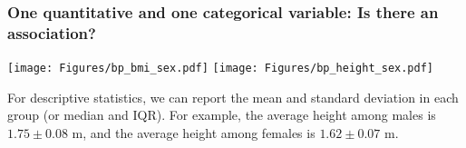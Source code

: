 \begin{frame}
\frametitle{One quantitative and one categorical variable: Is there an association?}
\begin{center}
\texttt{[image: Figures/bp\_bmi\_sex.pdf]} \hspace{0.1in}
\texttt{[image: Figures/bp\_height\_sex.pdf]}
\end{center}
For descriptive statistics, we can report the mean and standard deviation in each group (or median and IQR).  For example, the average height among males is $1.75 \pm 0.08$ m, and the average height among females is $1.62 \pm 0.07$ m.
\end{frame}



